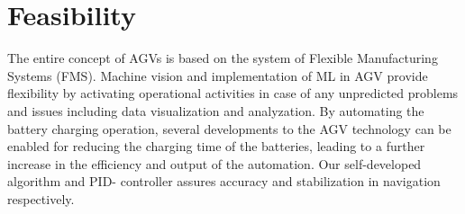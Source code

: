 \documentclass[12pt]{article}
\begin{document}
\section{Feasibility}

The entire concept of AGVs is based on the system of Flexible Manufacturing Systems (FMS). Machine vision and implementation of ML in AGV provide flexibility by activating operational activities in case of any unpredicted problems and issues including data visualization and analyzation. By automating the battery charging operation, several developments to the AGV technology can be enabled for reducing the charging time of the batteries, leading to a further increase in the efficiency and output of the automation. Our self-developed algorithm and PID- controller assures accuracy and stabilization in navigation respectively.








\end{document}
